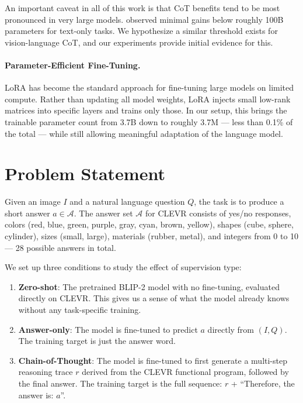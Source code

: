 \documentclass[11pt,twocolumn]{article}
\begin{document}
An important caveat in all of this work is that CoT benefits tend to be most pronounced in very large models. \citet{wei2022chain} observed minimal gains below roughly 100B parameters for text-only tasks. We hypothesize a similar threshold exists for vision-language CoT, and our experiments provide initial evidence for this.

\paragraph{Parameter-Efficient Fine-Tuning.}
LoRA \cite{hu2022lora} has become the standard approach for fine-tuning large models on limited compute. Rather than updating all model weights, LoRA injects small low-rank matrices into specific layers and trains only those. In our setup, this brings the trainable parameter count from 3.7B down to roughly 3.7M — less than 0.1\% of the total — while still allowing meaningful adaptation of the language model.

\section{Problem Statement}

Given an image $I$ and a natural language question $Q$, the task is to produce a short answer $a \in \mathcal{A}$. The answer set $\mathcal{A}$ for CLEVR consists of yes/no responses, colors (red, blue, green, purple, gray, cyan, brown, yellow), shapes (cube, sphere, cylinder), sizes (small, large), materials (rubber, metal), and integers from 0 to 10 — 28 possible answers in total.

We set up three conditions to study the effect of supervision type:

\begin{enumerate}
    \item \textbf{Zero-shot}: The pretrained BLIP-2 model with no fine-tuning, evaluated directly on CLEVR. This gives us a sense of what the model already knows without any task-specific training.
    \item \textbf{Answer-only}: The model is fine-tuned to predict $a$ directly from $(I, Q)$. The training target is just the answer word.
    \item \textbf{Chain-of-Thought}: The model is fine-tuned to first generate a multi-step reasoning trace $r$ derived from the CLEVR functional program, followed by the final answer. The training target is the full sequence: $r$ + ``Therefore, the answer is: $a$''.
\end{enumerate}
\end{document}
